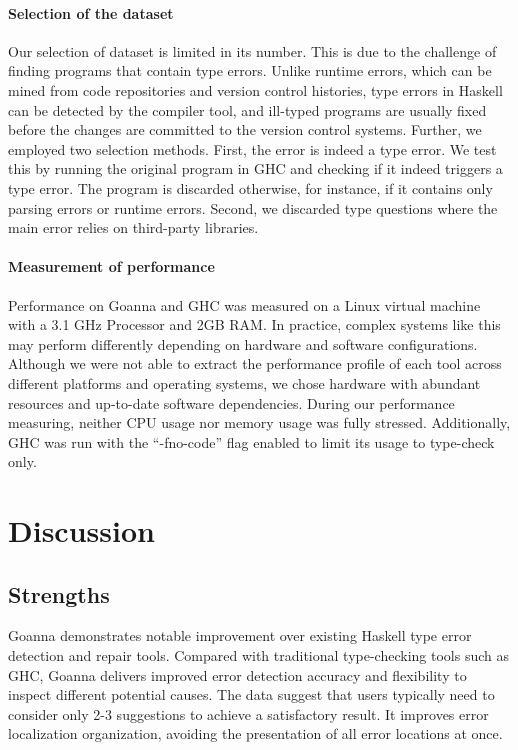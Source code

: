     \paragraph{\textbf{Selection of the dataset}}
    Our selection of dataset is limited in its number. This is due to the challenge of finding programs that contain type errors. Unlike runtime errors, which can be mined from code repositories and version control histories, type errors in Haskell can be detected by the compiler tool, and ill-typed programs are usually fixed before the changes are committed to the version control systems. Further, we employed two selection methods. First, the error is indeed a type error. We test this by running the original program in GHC and checking if it indeed triggers a type error. The program is discarded otherwise, for instance, if it contains only parsing errors or runtime errors. Second, we discarded type questions where the main error relies on third-party libraries. 
    
  
        
    \paragraph{\textbf{Measurement of performance}} Performance on Goanna and GHC was measured on a Linux virtual machine with a 3.1 GHz Processor and 2GB RAM. In practice, complex systems like this may perform differently depending on hardware and software configurations. Although we were not able to extract the performance profile of each tool across different platforms and operating systems, we chose hardware with abundant resources and up-to-date software dependencies. During our performance measuring, neither CPU usage nor memory usage was fully stressed. Additionally, GHC was run with the ``-fno-code'' flag enabled to limit its usage to type-check only.


    \section{Discussion} \label{sec:discussion}


    \subsection{Strengths}
    Goanna demonstrates notable improvement over existing Haskell type error detection and repair tools. Compared with traditional type-checking tools such as GHC, Goanna delivers improved error detection accuracy and flexibility to inspect different potential causes. The data suggest that users typically need to consider only 2-3 suggestions to achieve a satisfactory result. It improves error localization organization, avoiding the presentation of all error locations at once.



